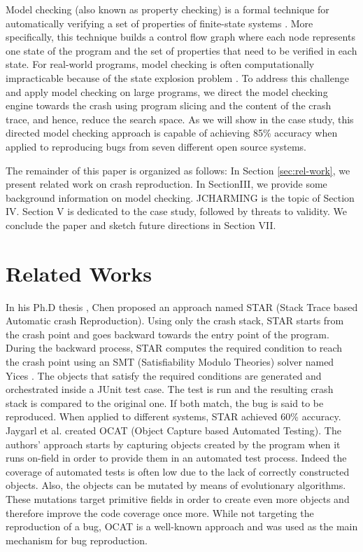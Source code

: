 \documentclass[times]{smrauth}
\begin{document}
Model checking (also known as property checking) is a formal
technique for automatically verifying a set of properties of
finite-state systems \cite{Baier2008}. More specifically, this technique
builds a control flow graph where each node represents one
state of the program and the set of properties that need to be
verified in each state. For real-world programs, model
checking is often computationally impracticable because of
the state explosion problem \cite{Baier2008}. To address this challenge and
apply model checking on large programs, we direct the model
checking engine towards the crash using program slicing and
the content of the crash trace, and hence, reduce the search
space. As we will show in the case study, this directed model
checking approach is capable of achieving 85\% accuracy
when applied to reproducing bugs from seven different open
source systems.

The remainder of this paper is organized as follows: In Section
\ref{sec:rel-work}, we present related work on crash reproduction. In SectionIII, we provide some background information on model
checking. JCHARMING is the topic of Section IV. Section V
is dedicated to the case study, followed by threats to validity.
We conclude the paper and sketch future directions in Section
VII.

\section{Related Works\label{sec:rel-work}}

In his Ph.D thesis \cite{Chen2013}, Chen proposed an approach named STAR (Stack Trace based Automatic crash Reproduction). 
Using only the crash stack, STAR starts from the crash point and goes backward towards the entry point of the program. 
During the backward process, STAR computes the required condition to reach the crash point using an SMT (Satisfiability Modulo Theories) solver named Yices \cite{Dutertre2006}. 
The objects that satisfy the required conditions are generated and orchestrated inside a JUnit test case. The test is run and the resulting crash stack is compared to the original one. If both match, the bug is said to be reproduced. When applied to different systems, STAR achieved 60\% accuracy. \\

Jaygarl et al. \cite{Jaygarl} created OCAT (Object Capture based Automated Testing). 
The authors’ approach starts by capturing objects created by the program when it runs on-field in order to provide them in an automated test process. Indeed the coverage of automated tests is often low due to the lack of correctly constructed objects. 
Also, the objects can be mutated by means of evolutionary algorithms. These mutations target primitive fields in order to create even more objects and therefore improve the code coverage once more. 
While not targeting the reproduction of a bug, OCAT is a well-known approach and was used as the main mechanism for bug reproduction. \\
\end{document}
